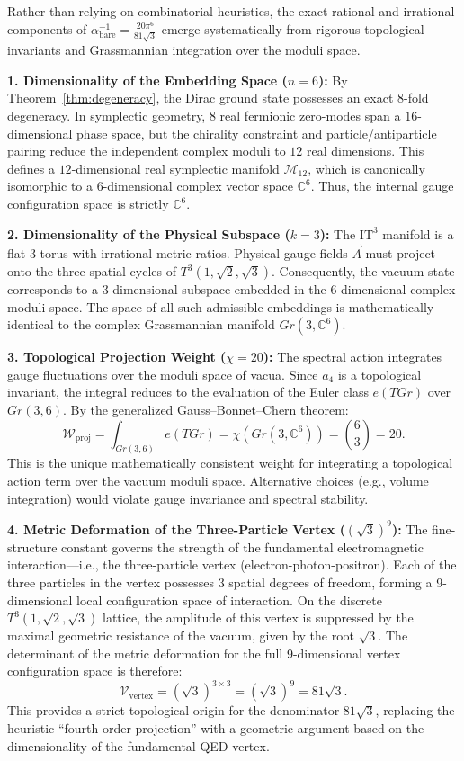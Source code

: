 \documentclass[onecolumn,aps,prd,superscriptaddress,nofootinbib,amsmath,amssymb]{revtex4-2}
\theoremstyle{definition}
\theoremstyle{remark}
\newcommand{\ITthree}{\ensuremath{\mathrm{IT}^3}}
\newcommand{\Tthree}{T^3(1,\sqrt{2},\sqrt{3})}
\begin{document}
Rather than relying on combinatorial heuristics, the exact rational and irrational components of $\alpha_{\text{bare}}^{-1} = \frac{20\pi^6}{81\sqrt{3}}$ emerge systematically from rigorous topological invariants and Grassmannian integration over the moduli space.

\textbf{1. Dimensionality of the Embedding Space ($n=6$):}
By Theorem~\ref{thm:degeneracy}, the Dirac ground state possesses an exact 8-fold degeneracy. In symplectic geometry, $8$ real fermionic zero-modes span a $16$-dimensional phase space, but the chirality constraint and particle/antiparticle pairing reduce the independent complex moduli to $12$ real dimensions. This defines a $12$-dimensional real symplectic manifold $\mathcal{M}_{12}$, which is canonically isomorphic to a $6$-dimensional complex vector space $\mathbb{C}^6$. Thus, the internal gauge configuration space is strictly $\mathbb{C}^6$.

\textbf{2. Dimensionality of the Physical Subspace ($k=3$):}
The $\ITthree$ manifold is a flat 3-torus with irrational metric ratios. Physical gauge fields $\vec{A}$ must project onto the three spatial cycles of $\Tthree$. Consequently, the vacuum state corresponds to a $3$-dimensional subspace embedded in the $6$-dimensional complex moduli space. The space of all such admissible embeddings is mathematically identical to the complex Grassmannian manifold $Gr(3, \mathbb{C}^6)$.

\textbf{3. Topological Projection Weight ($\chi = 20$):}
The spectral action integrates gauge fluctuations over the moduli space of vacua. Since $a_4$ is a topological invariant, the integral reduces to the evaluation of the Euler class $e(TGr)$ over $Gr(3,6)$. By the generalized Gauss--Bonnet--Chern theorem:
\begin{equation}
\mathcal{W}_{\text{proj}} = \int_{Gr(3,6)} e(TGr) = \chi(Gr(3,\mathbb{C}^6)) = \binom{6}{3} = 20.
\label{eq:euler_grass}
\end{equation}
This is the unique mathematically consistent weight for integrating a topological action term over the vacuum moduli space. Alternative choices (e.g., volume integration) would violate gauge invariance and spectral stability.

\textbf{4. Metric Deformation of the Three-Particle Vertex ($(\sqrt{3})^9$):}
The fine-structure constant governs the strength of the fundamental electromagnetic interaction---i.e., the three-particle vertex (electron-photon-positron). Each of the three particles in the vertex possesses 3 spatial degrees of freedom, forming a 9-dimensional local configuration space of interaction. On the discrete $\Tthree$ lattice, the amplitude of this vertex is suppressed by the maximal geometric resistance of the vacuum, given by the root $\sqrt{3}$. The determinant of the metric deformation for the full 9-dimensional vertex configuration space is therefore:
\begin{equation}
\mathcal{V}_{\text{vertex}} = (\sqrt{3})^{3 \times 3} = (\sqrt{3})^9 = 81\sqrt{3}.
\end{equation}
This provides a strict topological origin for the denominator $81\sqrt{3}$, replacing the heuristic ``fourth-order projection'' with a geometric argument based on the dimensionality of the fundamental QED vertex.
\end{document}
